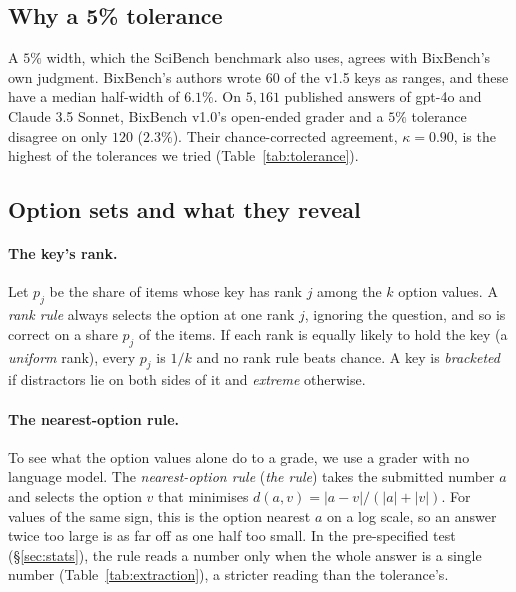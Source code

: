 \documentclass{article}
\begin{document}
\subsection{Why a 5\% tolerance}
\label{sec:reference}

A $5\%$ width, which the SciBench benchmark also uses, agrees with BixBench's own judgment. BixBench's authors wrote
$60$ of the v1.5 keys as ranges, and these have a median half-width of $6.1\%$. On $5{,}161$ published answers of
gpt-4o and Claude 3.5 Sonnet, BixBench v1.0's open-ended grader and a $5\%$ tolerance disagree on only $120$
($2.3\%$). Their chance-corrected agreement, $\kappa=0.90$, is the highest of the tolerances we tried
(Table~\ref{tab:tolerance}).

\subsection{Option sets and what they reveal}
\label{sec:theory}

\paragraph{The key's rank.} Let $p_j$ be the share of items whose key has rank $j$ among the $k$ option values. A
\emph{rank rule} always selects the option at one rank $j$, ignoring the question, and so is correct on a share $p_j$
of the items. If each rank is equally likely to hold the key (a \emph{uniform} rank), every $p_j$ is $1/k$ and no
rank rule beats chance. A key is \emph{bracketed} if distractors lie on both sides of it and \emph{extreme} otherwise.

\paragraph{The nearest-option rule.} To see what the option values alone do to a grade, we use a grader with no
language model. The \emph{nearest-option rule} (\emph{the rule}) takes the submitted number $a$ and selects the option
$v$ that minimises $d(a,v)=|a-v|/(|a|+|v|)$. For values of the same sign, this is the option nearest $a$ on a log
scale, so an answer twice too large is as far off as one half too small.
In the pre-specified test (\S\ref{sec:stats}), the rule reads a number only when the whole answer is a single number
(Table~\ref{tab:extraction}), a stricter reading than the tolerance's.
\end{document}
